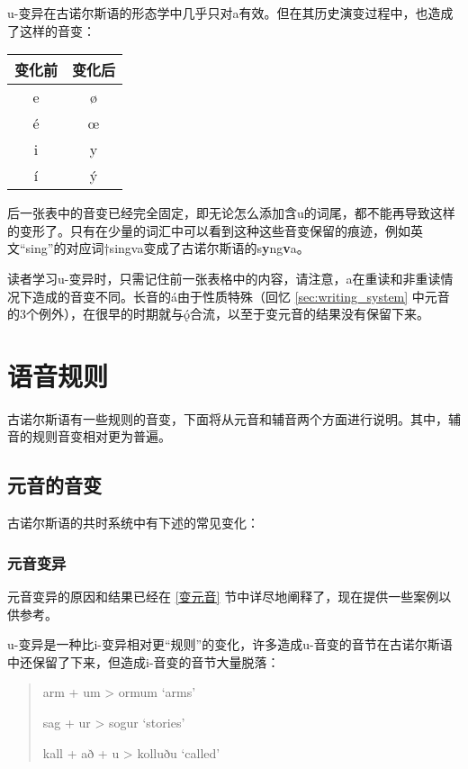u-变异在古诺尔斯语的形态学中几乎只对a有效。但在其历史演变过程中，也造成了这样的音变：

\begin{table}[H]
  \centering
  \begin{tabular}{cc}
    \hline
    \textbf{变化前} & \textbf{变化后} \\ \hline
    e               & ø               \\
    é               & œ               \\
    i               & y               \\
    í               & ý               \\ \hline
  \end{tabular}
\end{table}

后一张表中的音变已经完全固定，即无论怎么添加含u的词尾，都不能再导致这样的变形了。只有在少量的词汇中可以看到这种这些音变保留的痕迹，例如英文``sing''的对应词†singva变成了古诺尔斯语的s\textbf{y}ng\textbf{v}a。

读者学习u-变异时，只需记住前一张表格中的内容，请注意，a在重读和非重读情况下造成的音变不同。长音的á由于性质特殊（回忆 \ref{sec:writing_system} 中元音的3个例外），在很早的时期就与ǫ́合流，以至于变元音的结果没有保留下来。

\section{语音规则}
\label{语音规则}

古诺尔斯语有一些规则的音变，下面将从元音和辅音两个方面进行说明。其中，辅音的规则音变相对更为普遍。

\subsection{元音的音变}
\label{元音的音变}

古诺尔斯语的共时系统中有下述的常见变化：
\subsubsection{元音变异}
\label{元音变异}


元音变异的原因和结果已经在 \ref{变元音} 节中详尽地阐释了，现在提供一些案例以供参考。

u-变异是一种比i-变异相对更``规则''的变化，许多造成u-音变的音节在古诺尔斯语中还保留了下来，但造成i-音变的音节大量脱落：

\begin{quote}
  arm + um > ormum `arms'

  sag + ur > sogur `stories'

  kall + að + u > kolluðu `called'
\end{quote}

